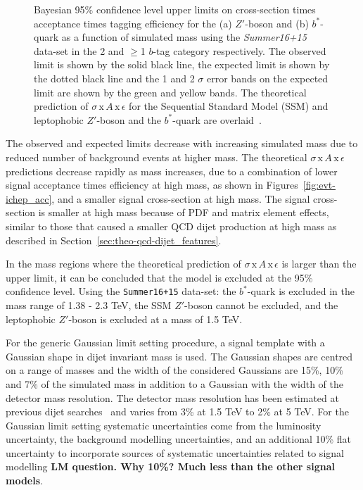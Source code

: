 \begin{figure}[!ht]
           {Bayesian 95\% confidence level upper limits on cross-section times acceptance times tagging efficiency
             for the (a) $Z'$-boson and (b) $b^*$-quark  as a function of simulated mass
             using the \textit{Summer16+15} data-set in the 2 and $\geq$1 $b$-tag category respectively.
             The observed limit is shown by the solid black line,
             the expected limit is shown by the dotted black line
             and the 1 and 2 $\sigma$ error bands on the expected limit are shown by the green and yellow bands.
             The theoretical prediction of $\sigma\,\text{x}\,\mathit{A}\,\text{x}\,\epsilon$
             for the Sequential Standard Model (SSM) and leptophobic $Z'$-boson and the $b^*$-quark are overlaid~\cite{dibjet-ichep_conf}.
           }
  \label{fig:lim-summer_benchmark}
\end{figure}

The observed and expected limits decrease with increasing simulated mass
due to reduced number of background events at higher mass.
The theoretical $\sigma\,\text{x}\,\mathit{A}\,\text{x}\,\epsilon$ predictions
decrease rapidly as mass increases, due to a combination of
lower signal acceptance times efficiency at high mass, as shown in Figures~\ref{fig:evt-ichep_acc},
and a smaller signal cross-section at high mass.
The signal cross-section is smaller at high mass because of PDF and matrix element effects,
similar to those that caused a smaller QCD dijet production at high mass as described in
 Section~\ref{sec:theo-qcd-dijet_features}.

In the mass regions where the theoretical prediction of $\sigma\,\text{x}\,\mathit{A}\,\text{x}\,\epsilon$
is larger than the upper limit, it can be concluded that the model is excluded at the 95\% confidence level.
Using the \verb|Summer16+15| data-set:
the \mbox{$b^*$-quark} is excluded in the mass range of 1.38 - 2.3 TeV,
the SSM $Z'$-boson cannot be excluded,
and the leptophobic $Z'$-boson is excluded at a mass of 1.5 TeV.

\FloatBarrier

For the generic Gaussian limit setting procedure,
a signal template with a Gaussian shape in dijet invariant mass is used.
The Gaussian shapes are centred on a range of masses
and the width of the considered Gaussians are
15\%, 10\% and 7\% of the simulated mass
in addition to a Gaussian with the width of the detector mass resolution.
The detector mass resolution has been estimated
at previous dijet searches~\cite{dijet-mori16_paper}
and varies from 3\% at 1.5 TeV to 2\% at 5 TeV.
For the Gaussian limit setting
systematic uncertainties come from the luminosity uncertainty,
the background modelling uncertainties,
and an additional 10\% flat uncertainty to
incorporate sources of systematic uncertainties related to signal modelling
\textbf{LM question. Why 10\%? Much less than the other signal models}.

